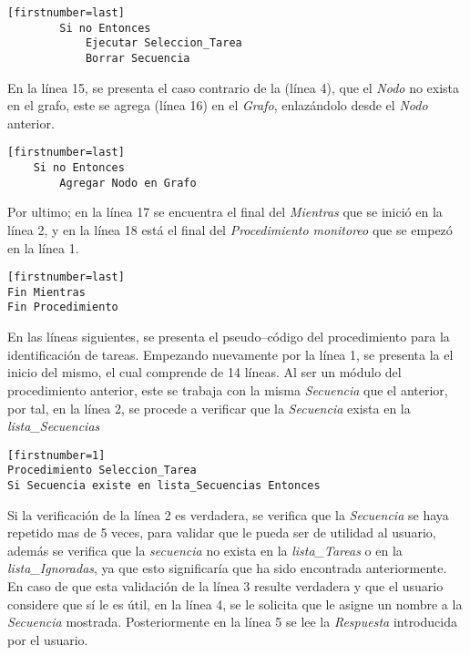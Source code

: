 \begin{tiny}
\begin{lstlisting}[name=EXmonitor][firstnumber=last]
        Si no Entonces
            Ejecutar Seleccion_Tarea
            Borrar Secuencia
\end{lstlisting}
\end{tiny}


En la l\'inea 15, se presenta el caso contrario de la (l\'inea 4), que el 
 \emph{Nodo} no exista en el grafo, este se agrega (l\'inea 16) en el 
 \emph{Grafo}, enlaz\'andolo desde el \emph{Nodo} anterior. 


\begin{tiny}
\begin{lstlisting}[name=EXmonitor][firstnumber=last]
    Si no Entonces
        Agregar Nodo en Grafo
\end{lstlisting}
\end{tiny}

Por ultimo; en la l\'inea 17 se encuentra el final del \emph{Mientras} que se 
 inici\'o en la l\'inea 2, y en la l\'inea 18 est\'a el final del 
 \emph{Procedimiento monitoreo} que se empez\'o en la l\'inea 1.

\begin{tiny}
\begin{lstlisting}[name=EXmonitor][firstnumber=last]
Fin Mientras
Fin Procedimiento 
\end{lstlisting}
\end{tiny}




En las l\'ineas siguientes, se presenta el pseudo--c\'odigo del procedimiento
 para la identificaci\'on de tareas. Empezando nuevamente por la l\'inea 1, se 
 presenta la el inicio del mismo, el cual comprende de 14 l\'ineas. Al ser un 
 m\'odulo del procedimiento anterior, este se trabaja con la misma 
 \emph{Secuencia} que el anterior, por tal, en la l\'inea 2, se procede a 
 verificar que la \emph{Secuencia} exista en la \emph{lista\_Secuencias} 

\begin{tiny}
\begin{lstlisting}[name=EXseleccion][firstnumber=1]
Procedimiento Seleccion_Tarea
Si Secuencia existe en lista_Secuencias Entonces
\end{lstlisting}
\end{tiny}

Si la verificaci\'on de la l\'inea 2 es verdadera, se verifica que la 
 \emph{Secuencia} se haya repetido mas de 5 veces, para validar que le pueda 
 ser de utilidad al usuario, adem\'as se verifica que la \emph{secuencia} no 
 exista en la \emph{lista\_Tareas} o en la \emph{lista\_Ignoradas}, ya que 
 esto significar\'ia que ha sido encontrada anteriormente. 
 En caso de que esta validaci\'on de la l\'inea 3 resulte verdadera
 y que el usuario considere que s\'i le es \'util, en la l\'inea 4, se le
 solicita que le asigne un nombre a la \emph{Secuencia} mostrada. 
 Posteriormente en la l\'inea 5 se lee la \emph{Respuesta} introducida por el 
 usuario.

